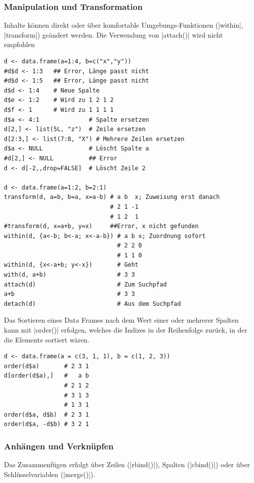 \documentclass[10pt,twocolumn]{scrartcl}
\renewcommand{\lstinline}{\mycoloredinline}
\begin{document}
\subsubsection{Manipulation und Transformation}

Inhalte können direkt oder über komfortable Umgebungs-Funktionen (\lstinline|within|, \lstinline|transform|) geändert werden. Die Verwendung von \lstinline|attach()| wird nicht empfohlen

\begin{lstlisting}
d <- data.frame(a=1:4, b=c("x","y"))
#d$d <- 1:3   ## Error, Länge passt nicht
#d$d <- 1:5   ## Error, Länge passt nicht
d$d <- 1:4    # Neue Spalte
d$e <- 1:2    # Wird zu 1 2 1 2
d$f <- 1      # Wird zu 1 1 1 1
d$a <- 4:1              # Spalte ersetzen
d[2,] <- list(5L, "z")  # Zeile ersetzen
d[2:3,] <- list(7:8, "X") # Mehrere Zeilen ersetzen
d$a <- NULL             # Löscht Spalte a
#d[2,] <- NULL          ## Error
d <- d[-2,,drop=FALSE]  # Löscht Zeile 2

d <- data.frame(a=1:2, b=2:1)
transform(d, a=b, b=a, x=a-b) # a b  x; Zuweisung erst danach
                              # 2 1 -1
                              # 1 2  1
#transform(d, x=a+b, y=x)     ##Error, x nicht gefunden
within(d, {a<-b; b<-a; x<-a-b}) # a b x; Zuordnung sofort
                                # 2 2 0
                                # 1 1 0
within(d, {x<-a+b; y<-x})       # Geht
with(d, a+b)                    # 3 3
attach(d)                       # Zum Suchpfad
a+b                             # 3 3
detach(d)                       # Aus dem Suchpfad
\end{lstlisting}

Das Sortieren eines Data Frames nach dem Wert einer oder mehrerer Spalten kann mit \lstinline|order()| erfolgen, welches die Indizes in der Reihenfolge zurück, in der die Elemente sortiert wären.

\begin{lstlisting}
d <- data.frame(a = c(3, 1, 1), b = c(1, 2, 3))
order(d$a)       # 2 3 1
d[order(d$a),]   #   a b
                 # 2 1 2
                 # 3 1 3
                 # 1 3 1
order(d$a, d$b)  # 2 3 1
order(d$a, -d$b) # 3 2 1
\end{lstlisting}


\subsubsection{Anhängen und Verknüpfen}

Das Zusammenfügen erfolgt über Zeilen (\lstinline|rbind()|), Spalten (\lstinline|cbind()|) oder über Schlüsselvariablen (\lstinline|merge()|).
\end{document}
